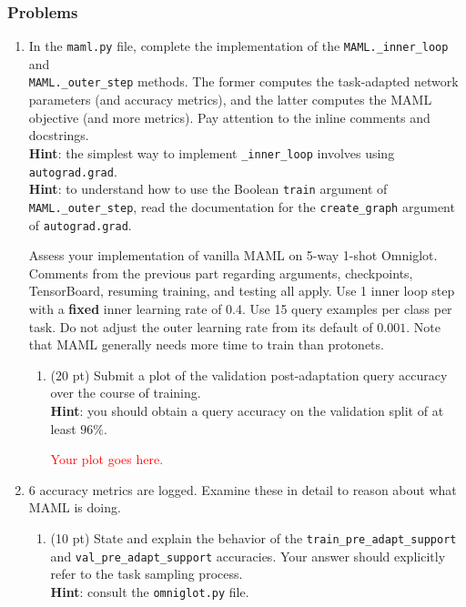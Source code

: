 \documentclass[12pt]{article}
\begin{document}
\subsubsection*{Problems}


\begin{enumerate}
    \item In the \texttt{maml.py} file, complete the implementation of the \texttt{MAML.\_inner\_loop} and \\ \texttt{MAML.\_outer\_step} methods. The former computes the task-adapted network parameters (and accuracy metrics), and the latter computes the MAML objective (and more metrics). Pay attention to the inline comments and docstrings. \\
    \textbf{Hint}: the simplest way to implement \texttt{\_inner\_loop} involves using \texttt{autograd.grad}. \\
    \textbf{Hint}: to understand how to use the Boolean \texttt{train} argument of \texttt{MAML.\_outer\_step}, read the documentation for the \texttt{create\_graph} argument of \texttt{autograd.grad}.
    
    Assess your implementation of vanilla MAML on 5-way 1-shot Omniglot. Comments from the previous part regarding arguments, checkpoints, TensorBoard, resuming training, and testing all apply. Use 1 inner loop step with a \textbf{fixed} inner learning rate of 0.4. Use 15 query examples per class per task. Do not adjust the outer learning rate from its default of $0.001$. Note that MAML generally needs more time to train than protonets.
    \begin{enumerate}
        \newpage
        \item (20 pt) Submit a plot of the validation post-adaptation query accuracy over the course of training. \\
        \textbf{Hint}: you should obtain a query accuracy on the validation split of at least $96\%$.
        
        \textcolor{red}{Your plot goes here.}
        
    \end{enumerate}
    
    \newpage
    \item 6 accuracy metrics are logged. Examine these in detail to reason about what MAML is doing.
    \begin{enumerate}[label=(\alph*)]
        \item (10 pt) State and explain the behavior of the \texttt{train\_pre\_adapt\_support} and \texttt{val\_pre\_adapt\_support} accuracies. Your answer should explicitly refer to the task sampling process. \\ \textbf{Hint}: consult the \texttt{omniglot.py} file.


\end{enumerate}
\end{enumerate}
\end{document}
